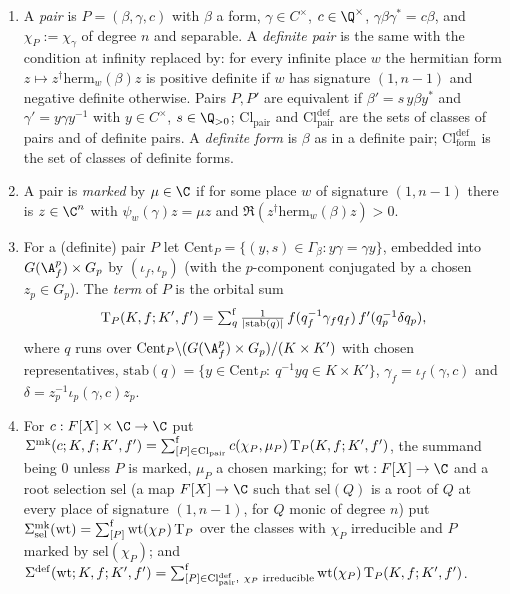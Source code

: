 \begin{definition}\label{pf:ks1:def-pairs}
\begin{enumerate}
\item A \emph{pair} is $P=(\beta,\gamma,c)$ with $\beta$ a form, $\gamma\in C^\times$, $c\in\Q^\times$, $\gamma\beta\gamma^*=c\beta$,
  and $\chi_P:=\chi_\gamma$ of degree $n$ and separable. A \emph{definite pair} is the same with the condition at infinity
  replaced by: for every infinite place $w$ the hermitian form $z\mapsto z^\dagger\mathrm{herm}_w(\beta)z$ is positive
  definite if $w$ has signature $(1,n-1)$ and negative definite otherwise. Pairs $P,P'$ are equivalent if
  $\beta'=s\,y\beta y^*$ and $\gamma'=y\gamma y^{-1}$ with $y\in C^\times$, $s\in\Q_{>0}$; $\mathrm{Cl}_{\mathrm{pair}}$ and $\mathrm{Cl}^{\mathrm{def}}_{\mathrm{pair}}$
  are the sets of classes of pairs and of definite pairs. A \emph{definite form} is $\beta$ as in a definite pair;
  $\mathrm{Cl}^{\mathrm{def}}_{\mathrm{form}}$ is the set of classes of definite forms.
\item A pair is \emph{marked} by $\mu\in\C$ if for some place $w$ of signature $(1,n-1)$ there is $z\in\C^n$ with
  $\psi_w(\gamma)z=\mu z$ and $\Re(z^\dagger\mathrm{herm}_w(\beta)z)>0$.
\item For a (definite) pair $P$ let $\mathrm{Cent}_P=\{(y,s)\in\Gamma_\beta: y\gamma=\gamma y\}$, embedded into
  $G(\ksoneAfp)\times G_p$ by $(\iota_f,\iota_p)$ (with the $p$-component conjugated by a chosen $z_p\in G_p$). The
  \emph{term} of $P$ is the orbital sum
  \[\mathrm{T}_P(K,f;K',f')=\textstyle\sum\nolimits^{\mathrm f}_{q}\frac{1}{|\mathrm{stab}(q)|}\,f(q_f^{-1}\gamma_fq_f)\,f'(q_p^{-1}\delta q_p),\]
  where $q$ runs over $\mathrm{Cent}_P\backslash(G(\ksoneAfp)\times G_p)/(K\times K')$ with chosen representatives,
  $\mathrm{stab}(q)=\{y\in\mathrm{Cent}_P:\ q^{-1}yq\in K\times K'\}$, $\gamma_f=\iota_f(\gamma,c)$ and $\delta=z_p^{-1}\iota_p(\gamma,c)z_p$.
\item For $c:F[X]\times\C\to\C$ put
  $\Sigma^{\mathrm{mk}}(c;K,f;K',f')=\textstyle\sum\nolimits^{\mathrm f}_{[P]\in\mathrm{Cl}_{\mathrm{pair}}}c(\chi_P,\mu_P)\,\mathrm T_P(K,f;K',f')$, the summand being $0$
  unless $P$ is marked, $\mu_P$ a chosen marking; for $\mathrm{wt}:F[X]\to\C$ and a root selection $\mathrm{sel}$ (a map
  $F[X]\to\C$ such that $\mathrm{sel}(Q)$ is a root of $Q$ at every place of signature $(1,n-1)$, for $Q$ monic of degree $n$)
  put $\Sigma^{\mathrm{mk}}_{\mathrm{sel}}(\mathrm{wt})=\textstyle\sum\nolimits^{\mathrm f}_{[P]}\mathrm{wt}(\chi_P)\,\mathrm T_P$ over the classes
  with $\chi_P$ irreducible and $P$ marked by $\mathrm{sel}(\chi_P)$; and
  $\Sigma^{\mathrm{def}}(\mathrm{wt};K,f;K',f')=\ksonefs_{[P]\in\mathrm{Cl}^{\mathrm{def}}_{\mathrm{pair}},\ \chi_P\text{ irreducible}}\mathrm{wt}(\chi_P)\,\mathrm T_P(K,f;K',f')$.
\end{enumerate}
\end{definition}

